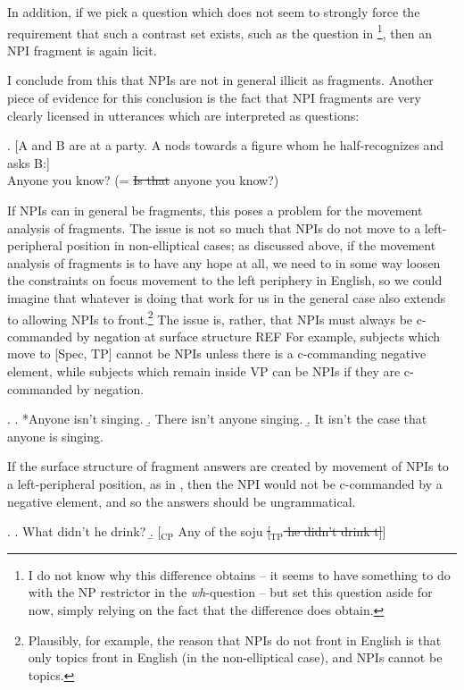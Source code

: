 \documentclass[11pt,letterpaper]{article}
\begin{document}
In addition, if we pick a question which does not seem to strongly force the requirement that such a contrast set exists, such as the question in \Last[b]\footnote{I do not know why this difference obtains -- it seems to have something to do with the NP restrictor in the {\it wh}-question -- but set this question aside for now, simply relying on the fact that the difference does obtain.}, then an NPI fragment is again licit.

I conclude from this that NPIs are not in general illicit as fragments. Another piece of evidence for this conclusion is the fact that NPI fragments are very clearly licensed in utterances which are interpreted as questions:

\ex. 	[A and B are at a party. A nods towards a figure whom he half-recognizes and asks B:]\\
	Anyone you know? (= \sout{Is that} anyone you know?)
	
If NPIs can in general be fragments, this poses a problem for the movement analysis of fragments. The issue is not so much that NPIs do not move to a left-peripheral position in non-elliptical cases; as discussed above, if the movement analysis of fragments is to have any hope at all, we need to in some way loosen the constraints on focus movement to the left periphery in English, so we could imagine that whatever is doing that work for us in the general case also extends to allowing NPIs to front.\footnote{Plausibly, for example, the reason that NPIs do not front in English is that only topics front in English (in the non-elliptical case), and NPIs cannot be topics.} The issue is, rather, that NPIs must always be c-commanded by negation at surface structure REF %
For example, subjects which move to [Spec, TP] cannot be NPIs unless there is a c-commanding negative element, while subjects which remain inside VP can be NPIs if they are c-commanded by negation. %

\ex. 	\a. *Anyone isn't singing.
	\b. There isn't anyone singing.
	\b. It isn't the case that anyone is singing.
	
If the surface structure of fragment answers are created by movement of NPIs to a left-peripheral position, as in \Next, then the NPI would not be c-commanded by a negative element, and so the answers should be ungrammatical.

\ex. 	\a. What didn't he drink?
	\b. [$_\mathrm{CP}$ Any of the soju \sout{[$_\mathrm{TP}$ he didn't drink t]}]
	
\end{document}
